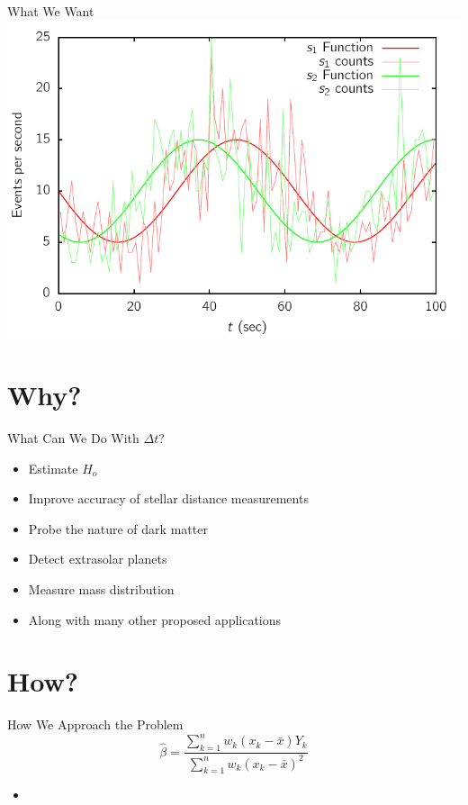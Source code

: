 \documentclass{beamer}
\begin{document}
\begin{frame}{What We Want}
  \includegraphics[width=\textwidth]{twostreams_full}
\end{frame}

\section{Why?}

\begin{frame}{What Can We Do With $\Delta t$?}
  \begin{itemize}
  \item<2-> Estimate $H_o$
  \item<3-> Improve accuracy of stellar distance measurements
  \item<4-> Probe the nature of dark matter
  \item<5-> Detect extrasolar planets
  \item<6-> Measure mass distribution
  \item<7-> Along with many other proposed applications
  \end{itemize}
\end{frame}

\section{How?}

\begin{frame}{How We Approach the Problem}
  \begin{equation}
    \hat{\beta}=\frac{\displaystyle\sum_{k=1}^{n}w_k(x_k-\bar{x})Y_k}{\displaystyle\sum_{k=1}^{n}w_k(x_k-\bar{x})^2}
  \end{equation}
  \begin{itemize}
    \item 
  \end{itemize}
\end{frame}
\end{document}
